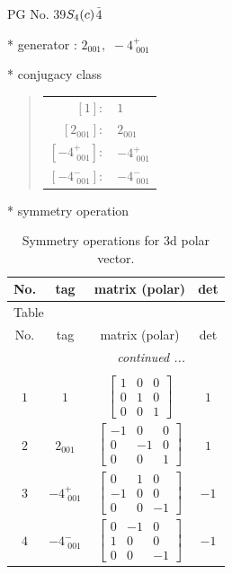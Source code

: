 \documentclass[fleqn,8pt]{jsarticle}
\begin{document}
\setcounter{MaxMatrixCols}{32}

\renewcommand{\tablename}{Table~}
\renewcommand{\figurename}{Figure~}
\begin{center}
\LARGE
PG No. 39\quad$S_{\rm 4}(c)$\quad$\bar{4}$\quad[ tetragonal ]
\end{center}

* generator : $2{}_{001},\,\,-4^{+}_{\,\,001}$

* conjugacy class
\begin{quote}
\begin{tabular}{rl}
$ [1]: $ & $ 1 $ \\
$ [2{}_{001}]: $ & $ 2{}_{001} $ \\
$ [-4^{+}_{\,\,001}]: $ & $ -4^{+}_{\,\,001} $ \\
$ [-4^{-}_{\,\,001}]: $ & $ -4^{-}_{\,\,001} $
\end{tabular}
\end{quote}

* symmetry operation
\renewcommand{\arraystretch}{1.3}
\begin{longtable}{cccc}
\caption{Symmetry operations for 3d polar vector.}
 \\
 \hline \hline
No. & tag & matrix (polar) & det \\ \hline \endfirsthead

\multicolumn{3}{l}{\tablename\ \thetable{}} \\
 \hline \hline
No. & tag & matrix (polar) & det \\ \hline \endhead

 \hline \hline
\multicolumn{3}{r}{\footnotesize\it continued ...} \\ \endfoot

 \hline \hline
\multicolumn{3}{r}{} \\ \endlastfoot

$ 1 $ & $ 1 $ & $ \begin{bmatrix} 1 & 0 & 0 \\ 0 & 1 & 0 \\ 0 & 0 & 1 \end{bmatrix} $ & $ 1 $ \\ \hline
$ 2 $ & $ 2{}_{001} $ & $ \begin{bmatrix} -1 & 0 & 0 \\ 0 & -1 & 0 \\ 0 & 0 & 1 \end{bmatrix} $ & $ 1 $ \\ \hline
$ 3 $ & $ -4^{+}_{\,\,001} $ & $ \begin{bmatrix} 0 & 1 & 0 \\ -1 & 0 & 0 \\ 0 & 0 & -1 \end{bmatrix} $ & $ -1 $ \\ \hline
$ 4 $ & $ -4^{-}_{\,\,001} $ & $ \begin{bmatrix} 0 & -1 & 0 \\ 1 & 0 & 0 \\ 0 & 0 & -1 \end{bmatrix} $ & $ -1 $ \\
\end{longtable}
\end{document}
